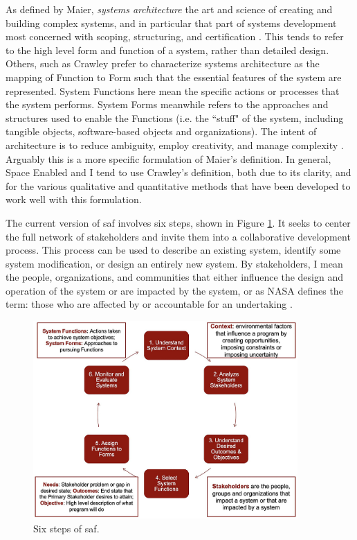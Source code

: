 As defined by Maier, \textit{systems architecture} the art and science of creating and building complex systems, and in particular that part of systems development most concerned with scoping, structuring, and certification \cite{maierArtSystemsArchitecting2009}. This tends to refer to the high level form and function of a system, rather than detailed design. Others, such as Crawley prefer to characterize systems architecture as the mapping of Function to Form such that the essential features of the system are represented. System Functions here mean the specific actions or processes that the system performs. System Forms meanwhile refers to the approaches and structures used to enable the Functions (i.e. the ``stuff" of the system, including tangible objects, software-based objects and organizations). The intent of architecture is to reduce ambiguity, employ creativity, and manage complexity \cite{crawleySystemArchitectureStrategy2015}. Arguably this is a more specific formulation of Maier's definition. In general, Space Enabled and I tend to use Crawley's definition, both due to its clarity, and for the various qualitative and quantitative methods that have been developed to work well with this formulation. 

The current version of \ac{saf} involves six steps, shown in Figure \ref{fig:saf}. It seeks to center the full network of stakeholders and invite them into a collaborative development process. This process can be used to describe an existing system, identify some system modification, or design an entirely new system. By stakeholders, I mean the people, organizations, and communities that either influence the design and operation of the system or are impacted by the system, or as NASA defines the term: those who are affected by or accountable for an undertaking \cite{nasaofficeofthechiefengineerNASASystemsEngineering2004}. 

\begin{figure}[h] 
\centering
\includegraphics[width=0.9\textwidth]{Figures/chap3/SAF.jpg}
\caption[Six steps of SAF]{Six steps of \ac{saf}.}
\label{fig:saf}
\end{figure}

